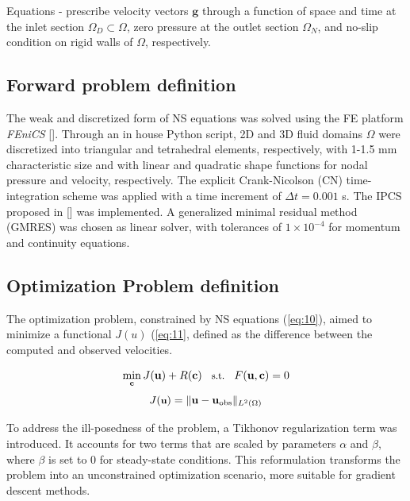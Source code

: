 Equations - prescribe velocity vectors $\mathbf{g}$ through a function of space and time at the inlet section $\Omega_D \subset \Omega$, zero pressure at the outlet section $\Omega_N$, and no-slip condition on rigid walls of $\Omega$, respectively.


\subsection*{Forward problem definition}

The weak and discretized form of NS equations was solved using the FE platform \emph{FEniCS} [\cite{alnaes2015fenics}]. Through an in house Python script, 2D and 3D fluid domains $\Omega$ were discretized into triangular and tetrahedral elements, respectively,  with 1-1.5 mm characteristic size and with linear and quadratic shape functions for nodal pressure and velocity, respectively. The explicit Crank-Nicolson (CN) time-integration scheme was applied with a time increment of $\Delta t = 0.001$ s. The IPCS proposed in [\cite{Dokken2020}] was implemented. A generalized minimal residual method (GMRES) was chosen as linear solver, with tolerances of $1 \times 10^{-4}$ for momentum and continuity equations.

\subsection*{Optimization Problem definition}
The optimization problem, constrained by NS equations (\cref{eq:10}), aimed to minimize a functional $J(u)$ (\cref{eq:11}, defined as the difference between the computed and observed velocities.

\begin{equation}
\small
\min_{\mathbf{c}} J(\mathbf{u}) + R(\mathbf{c}) \quad \text{s.t.} \quad F(\mathbf{u}, \mathbf{c}) = 0
\label{eq:10}
\end{equation}
\begin{equation}
\small
    J(\textbf{u}) = \| \mathbf{u} - \mathbf{u}_{\text{obs}} \|_{L^2(\Omega)}
    \label{eq:2.19}
\end{equation}

To address the ill-posedness of the problem, a Tikhonov regularization term was introduced. It accounts for two terms that are scaled by parameters \(\alpha\) and \(\beta\), where \(\beta\) is set to $0$ for steady-state conditions. This reformulation transforms the problem into an unconstrained optimization scenario, more suitable for gradient descent methods. 

